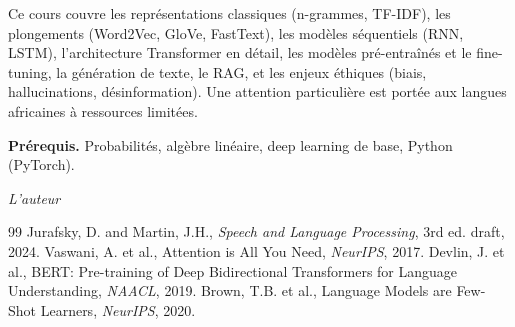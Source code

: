 \documentclass[12pt,a4paper,twoside]{book}
\theoremstyle{definition}
\theoremstyle{plain}
\theoremstyle{remark}
\begin{document}
\medskip

Ce cours couvre les repr\'esentations classiques (n-grammes, TF-IDF), les plongements (Word2Vec, GloVe, FastText), les mod\`eles s\'equentiels (RNN, LSTM), l'architecture Transformer en d\'etail, les mod\`eles pr\'e-entra\^in\'es et le fine-tuning, la g\'en\'eration de texte, le RAG, et les enjeux \'ethiques (biais, hallucinations, d\'esinformation). Une attention particuli\`ere est port\'ee aux langues africaines \`a ressources limit\'ees.

\medskip

\noindent\textbf{Pr\'erequis.} Probabilit\'es, alg\`ebre lin\'eaire, deep learning de base, Python (PyTorch).

\vfill
\hfill\textit{L'auteur}


\mainmatter














\backmatter
\begin{thebibliography}{99}
 Jurafsky, D. and Martin, J.H., \emph{Speech and Language Processing}, 3rd ed. draft, 2024.
 Vaswani, A. et al., Attention is All You Need, \emph{NeurIPS}, 2017.
 Devlin, J. et al., BERT: Pre-training of Deep Bidirectional Transformers for Language Understanding, \emph{NAACL}, 2019.
 Brown, T.B. et al., Language Models are Few-Shot Learners, \emph{NeurIPS}, 2020.
\end{thebibliography}
\printindex
\end{document}
